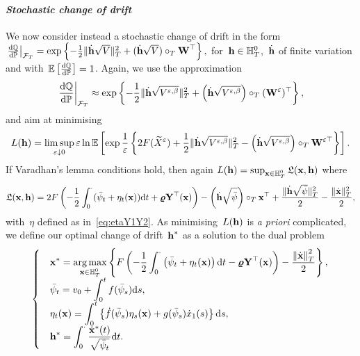 \paragraph{\textit{Stochastic change of drift}}
We now consider instead a stochastic change of drift in the form
$
\left.\frac{\D\QQ}{\D\PP}\right\vert_{\Ff_T} =\nobreak \exp\left\{-\frac{1}{2}\|\dot{\hh}\sqrt{V}\|_{T}^2 + (\dot{\hh}\sqrt{V})\cT\Wf^\top\right\},
$
for~${\hh \in \HH_T^0}$,~$\dot{\hh}$ of finite variation and with~$\EE\left[\frac{\D\QQ}{\D\PP}\right]=1$. 
Again, we use the approximation
\[
\left.\frac{\D\QQ}{\D\PP}\right\vert_{\Ff_T} \approx \exp\left\{-\frac{1}{2}\|\dot{\hh}\sqrt{V^{\eps,\beta}}\|_{T}^2 + \left(\dot{\hh}\sqrt{V^{\eps,\beta}}\right)\cT({\Wf^\eps})^\top\right\},
\]
and aim at minimising
\[
L(\hh) = \limsup\limits_{\eps \downarrow 0} \eps\ln\EE\left[\exp\frac{1}{\eps}\left\{
2F(\widetilde{X}^\eps) +\frac{1}{2}\|\dot{\hh}\sqrt{V^{\eps,\beta}}\|^2_T - \left (\dot{\hh}\sqrt{V^{\eps,\beta}}\right )\cT \Wf^{\eps\top}\right\}\right].
\]
If Varadhan's lemma conditions hold, then again
$L(\hh) = \sup_{\xx \in \HH_T^0}\Lf(\xx,\hh)$
where
$$
\Lf(\xx,\hh) = 2F\left(-\frac{1}{2}\int_0^\cdot(\bar\psi_t + \eta_t(\xx))\D t + \vrho \Yf^\top(\xx)\right) - \left (\dot{\hh}\sqrt{\bar\psi}\right )\cT \xx^\top + \frac{\|\dot{\hh}\sqrt{\bar\psi}\|_{T}^2}{2}
- \frac{\|\dot{\xx}\|_{T}^2}{2},
$$
with~$\eta$ defined as in~\eqref{eq:etaY1Y2}. As minimising~$L(\hh)$ is \textit{a priori} complicated, we define our optimal change of drift~$\hh^{*}$ as a solution to the dual problem
\[
\begin{cases}
&\displaystyle \xx^{*} = \argmax\limits_{\xx \in \HH_T^0} \left\{
F\left(-\frac{1}{2}\int_0^\cdot \left(\bar\psi_t + \eta_t(\xx)\right)\D t - \vrho \Yf^\top(\xx) \right)
- \frac{\left\|\dot{\xx}\right\|_{T}^2}{2}
\right\},\\
&\displaystyle \bar\psi_t = v_0 + \int_0^t f(\bar\psi_s)\D s, \\
&\displaystyle \eta_t(\xx) = \int_0^t\left\{\dot{f}(\bar\psi_s)\eta_s(\xx) + g(\bar\psi_s)\dot{x}_1(s)\right\}\D s, \\
&\displaystyle  \hh^{*} = \int_0^\cdot\frac{\dot{\xx}^{*}(t)}{\sqrt{\bar\psi_t}}\D t.
\end{cases}
\]

